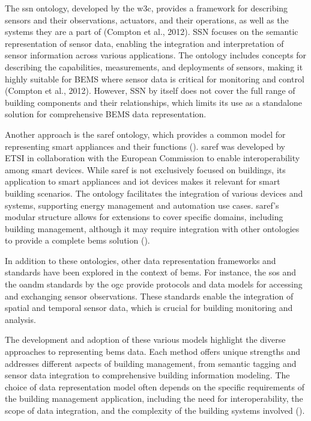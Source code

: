 The \gls{ssn} ontology, developed by the \gls{w3c}, provides a framework for describing sensors and their observations, actuators, and their operations, as well as the systems they are a part of (Compton et al., 2012).
SSN focuses on the semantic representation of sensor data, enabling the integration and interpretation of sensor information across various applications.
The ontology includes concepts for describing the capabilities, measurements, and deployments of sensors, making it highly suitable for BEMS where sensor data is critical for monitoring and control (Compton et al., 2012).
However, SSN by itself does not cover the full range of building components and their relationships, which limits its use as a standalone solution for comprehensive BEMS data representation.

Another approach is the \gls{saref} ontology, which provides a common model for representing smart appliances and their functions (\cite{Daniele2015}).
\gls{saref} was developed by ETSI in collaboration with the European Commission to enable interoperability among smart devices.
While \gls{saref} is not exclusively focused on buildings, its application to smart appliances and \gls{iot} devices makes it relevant for smart building scenarios.
The ontology facilitates the integration of various devices and systems, supporting energy management and automation use cases.
\gls{saref}'s modular structure allows for extensions to cover specific domains, including building management, although it may require integration with other ontologies to provide a complete \gls{bems} solution (\cite{Daniele2015}).

In addition to these ontologies, other data representation frameworks and standards have been explored in the context of \gls{bems}.
For instance, the \gls{sos} and the \gls{oandm} standards by the \gls{ogc} provide protocols and data models for accessing and exchanging sensor observations.
These standards enable the integration of spatial and temporal sensor data, which is crucial for building monitoring and analysis.

The development and adoption of these various models highlight the diverse approaches to representing \gls{bems} data.
Each method offers unique strengths and addresses different aspects of building management, from semantic tagging and sensor data integration to comprehensive building information modeling.
The choice of data representation model often depends on the specific requirements of the building management application, including the need for interoperability, the scope of data integration, and the complexity of the building systems involved (\cite{Compton2012,Daniele2015}).

